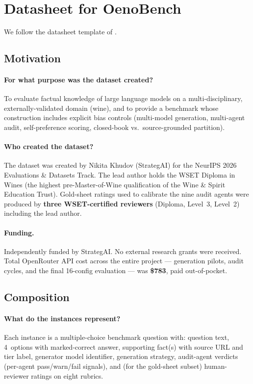 \section{Datasheet for OenoBench}
\label{app:datasheet}

We follow the datasheet template of \citet{gebru2021datasheets}.

\subsection{Motivation}
\paragraph{For what purpose was the dataset created?}
To evaluate factual knowledge of large language models on a multi-disciplinary,
externally-validated domain (wine), and to provide a benchmark whose
construction includes explicit bias controls (multi-model generation,
multi-agent audit, self-preference scoring, closed-book vs.\ source-grounded
partition).

\paragraph{Who created the dataset?}
The dataset was created by Nikita Khudov (StrategAI) for the NeurIPS 2026
Evaluations \& Datasets Track. The lead author holds the WSET Diploma in
Wines (the highest pre-Master-of-Wine qualification of the Wine \& Spirit
Education Trust). Gold-sheet ratings used to calibrate the nine audit
agents were produced by \textbf{three WSET-certified reviewers}
(Diploma, Level~3, Level~2) including the lead author.

\paragraph{Funding.}
Independently funded by StrategAI. No external research grants were
received. Total OpenRouter API cost across the entire project ---
generation pilots, audit cycles, and the final 16-config evaluation
--- was \textbf{\$783}, paid out-of-pocket.

\subsection{Composition}
\paragraph{What do the instances represent?}
Each instance is a multiple-choice benchmark question with: question
text, 4~options with marked-correct answer, supporting fact(s) with
source URL and tier label, generator model identifier, generation
strategy, audit-agent verdicts (per-agent pass/warn/fail signals), and
(for the gold-sheet subset) human-reviewer ratings on eight rubrics.

